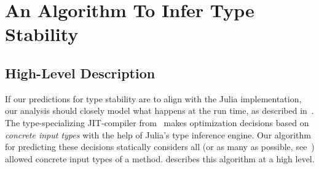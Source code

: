 \section{An Algorithm To Infer Type Stability}%
\label{sec:approx:algo}

\subsection{High-Level Description}
\label{ssec:algo:high}

If our predictions for type stability are to align with the Julia
implementation, our analysis should closely model what happens at the run time,
as described in~. The type-specializing JIT-compiler
from~ makes optimization decisions based on \emph{concrete
  input types} with the help of Julia's type inference engine. Our algorithm for
predicting these decisions statically considers all (or as many as possible,
see~) allowed concrete input types of a method.
 describes this algorithm at a high level.



